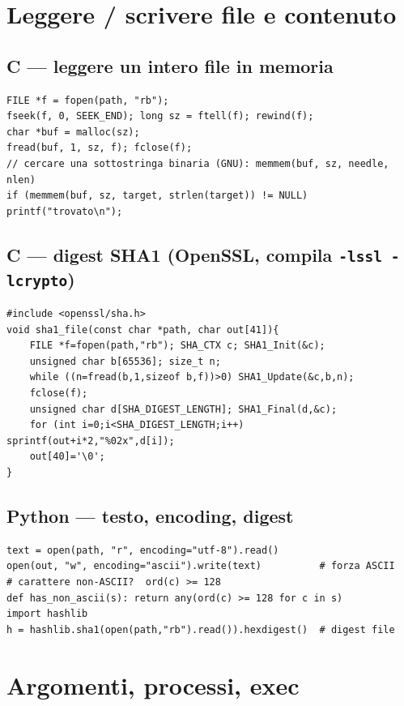\documentclass[10pt,a4paper]{article}
\begin{document}
\section{Leggere / scrivere file e contenuto}

\subsection{C --- leggere un intero file in memoria}
\begin{lstlisting}[style=c]
FILE *f = fopen(path, "rb");
fseek(f, 0, SEEK_END); long sz = ftell(f); rewind(f);
char *buf = malloc(sz);
fread(buf, 1, sz, f); fclose(f);
// cercare una sottostringa binaria (GNU): memmem(buf, sz, needle, nlen)
if (memmem(buf, sz, target, strlen(target)) != NULL) printf("trovato\n");
\end{lstlisting}

\subsection{C --- digest SHA1 (OpenSSL, compila \texttt{-lssl -lcrypto})}
\begin{lstlisting}[style=c]
#include <openssl/sha.h>
void sha1_file(const char *path, char out[41]){
    FILE *f=fopen(path,"rb"); SHA_CTX c; SHA1_Init(&c);
    unsigned char b[65536]; size_t n;
    while ((n=fread(b,1,sizeof b,f))>0) SHA1_Update(&c,b,n);
    fclose(f);
    unsigned char d[SHA_DIGEST_LENGTH]; SHA1_Final(d,&c);
    for (int i=0;i<SHA_DIGEST_LENGTH;i++) sprintf(out+i*2,"%02x",d[i]);
    out[40]='\0';
}
\end{lstlisting}

\subsection{Python --- testo, encoding, digest}
\begin{lstlisting}[style=py]
text = open(path, "r", encoding="utf-8").read()
open(out, "w", encoding="ascii").write(text)          # forza ASCII
# carattere non-ASCII?  ord(c) >= 128
def has_non_ascii(s): return any(ord(c) >= 128 for c in s)
import hashlib
h = hashlib.sha1(open(path,"rb").read()).hexdigest()  # digest file
\end{lstlisting}

\section{Argomenti, processi, exec}
\end{document}
